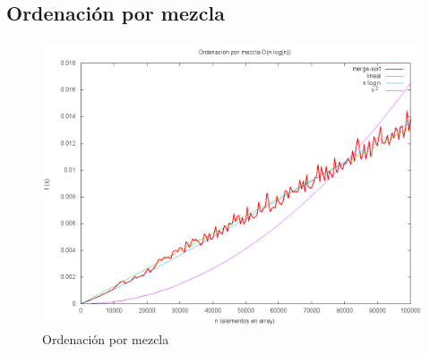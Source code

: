 \subsection{Ordenación por mezcla}

	\begin{figure}[H]
  		\centering
   	 	\includegraphics[width=1.0\textwidth]{merge-sort.png}
  		\caption{Ordenación por mezcla}
  		\label{fig:merge}
	\end{figure}
